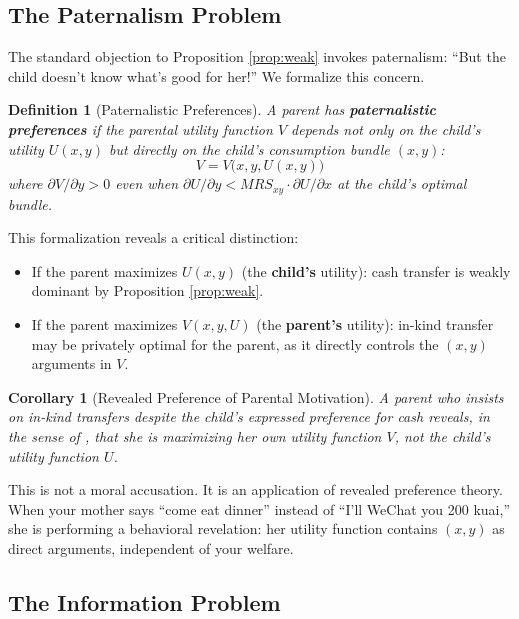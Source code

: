 \documentclass[AER]{AEA}
\newtheorem{corollary}{Corollary}
\newtheorem{definition}{Definition}
\begin{document}
\subsection{The Paternalism Problem}

The standard objection to Proposition \ref{prop:weak} invokes paternalism: ``But the child doesn't know what's good for her!'' We formalize this concern.

\begin{definition}[Paternalistic Preferences]
A parent has \textbf{paternalistic preferences} if the parental utility function $V$ depends not only on the child's utility $U(x,y)$ but directly on the child's consumption bundle $(x,y)$:
\begin{equation}
V = V\big(x, y, U(x,y)\big)
\end{equation}
where $\partial V / \partial y > 0$ even when $\partial U / \partial y < MRS_{xy} \cdot \partial U / \partial x$ at the child's optimal bundle.
\end{definition}

This formalization reveals a critical distinction:

\begin{itemize}[leftmargin=2em]
\item If the parent maximizes $U(x,y)$ (the \textbf{child's} utility): cash transfer is weakly dominant by Proposition \ref{prop:weak}.
\item If the parent maximizes $V(x,y,U)$ (the \textbf{parent's} utility): in-kind transfer may be privately optimal for the parent, as it directly controls the $(x,y)$ arguments in $V$.
\end{itemize}

\begin{corollary}[Revealed Preference of Parental Motivation]\label{cor:revealed}
A parent who insists on in-kind transfers despite the child's expressed preference for cash reveals, in the sense of \citet{samuelson1938}, that she is maximizing her own utility function $V$, not the child's utility function $U$.
\end{corollary}

This is not a moral accusation. It is an application of revealed preference theory. When your mother says ``come eat dinner'' instead of ``I'll WeChat you 200 kuai,'' she is performing a behavioral revelation: her utility function contains $(x,y)$ as direct arguments, independent of your welfare.

\subsection{The Information Problem}
\end{document}
